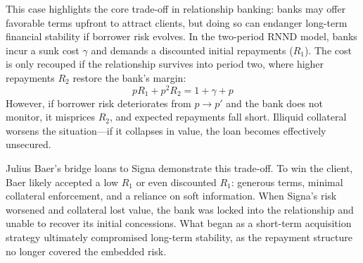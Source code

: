 This case highlights the core trade-off in relationship banking: banks may offer favorable terms upfront to attract clients, but doing so can endanger long-term financial stability if borrower risk evolves. In the two-period RNND model, banks incur a sunk cost $\gamma$ and demands a discounted initial repayments ($R_1$). The cost is only recouped if the relationship survives into period two, where higher repayments $R_2$ restore the bank's margin:
\begin{equation*}
    pR_1 + p^2R_2 = 1 + \gamma + p
\end{equation*}
However, if borrower risk deteriorates from $p \to p'$ and the bank does not monitor, it misprices $R_2$, and expected repayments fall short. Illiquid collateral worsens the situation---if it collapses in value, the loan becomes effectively unsecured.

Julius Baer's bridge loans to Signa demonstrate this trade-off. To win the client, Baer likely accepted a low $R_1$ or even discounted $R_1$: generous terms, minimal collateral enforcement, and a reliance on soft information. When Signa's risk worsened and collateral lost value, the bank was locked into the relationship and unable to recover its initial concessions. What began as a short-term acquisition strategy ultimately compromised long-term stability, as the repayment structure no longer covered the embedded risk.

